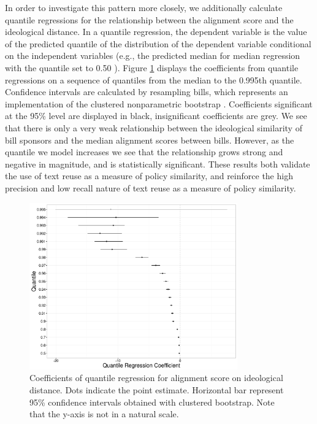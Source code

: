 \documentclass[12pt]{article} %
\begin{document}
In order to investigate this pattern more closely, we additionally calculate
quantile regressions for the relationship between the alignment score and the
ideological distance. In a quantile regression, the dependent variable is the value of the predicted quantile of the distribution of the dependent variable conditional on the independent variables (e.g., the predicted median for median regression with the quantile set to 0.50 \citep{harden2011linear}). Figure \ref{fig:quantile_regression} displays the
coefficients from quantile regressions on a sequence of quantiles from the
median to the 0.995th quantile. Confidence intervals are calculated by
resampling bills, which represents an implementation of the clustered
nonparametric bootstrap \citep{harden2011bootstrap}. Coefficients significant at the 95\% level are displayed in black, insignificant coefficients are grey. We see that there is only a very weak relationship between the ideological similarity of bill sponsors and the median alignment scores between bills. However, as the quantile we model increases we see that the relationship grows strong and negative in magnitude, and is statistically significant. These results both validate the use of text reuse as a measure of policy similarity, and reinforce the high precision and low recall nature of text reuse as a measure of policy similarity.




\begin{figure}[ht!]
    \centering
    \includegraphics[width=0.8\textwidth]{figures/quantile_regression.png}
    \caption{Coefficients of quantile regression for alignment score on
    ideological distance. Dots indicate the point estimate. Horizontal bar
represent 95\% confidence intervals obtained with clustered bootstrap. 
Note that the y-axis is not in a natural scale.}
    \label{fig:quantile_regression}
\end{figure}
\end{document}
